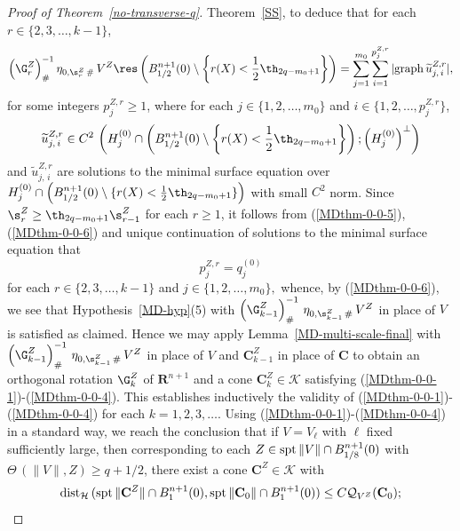 \documentclass[a4paper,11pt]{amsart}
\begin{document}
\begin{proof}[Proof of Theorem~\ref{no-transverse-q}]
Theorem~\ref{SS}, to deduce that for each $r \in \{2, 3, \ldots,k-1\}$, 
\begin{equation}\label{MDthm-0-0-6}
\left(\G_{r}^{Z}\right)^{-1}_{\#}\eta_{0, \s_{r}^{Z} \, \#} \, V^{Z} \res \left(B_{1/2}^{n+1}(0) \setminus \left\{r(X) < \frac{1}{2}\th_{2q-m_{0}+1}\right\}\right) = \sum_{j=1}^{m_{0}} \sum_{i=1}^{p_{j}^{Z,r}} |{\rm graph} \, \widetilde{u}_{j, \, i}^{Z,r}|,
\end{equation}
for some integers $p_{j}^{Z,r} \geq 1$, where for each $j \in \{1, 2, \ldots, m_{0}\}$ and $i \in \{1, 2, \ldots, p_{j}^{Z,r}\}$, 
$$\widetilde{u}_{j, \, i}^{Z,r}  \in C^{2}\,\left(H_{j}^{(0)} \cap \left(B_{1/2}^{n+1}(0) \setminus \left\{r(X) < \frac{1}{2}\th_{2q-m_{0}+1}\right\}\right); \left(H_{j}^{(0)}\right)^{\perp}\right)$$ 
and $\widetilde{u}_{j, \, i}^{Z,r}$ are solutions to the minimal surface equation over $H_{j}^{(0)} \cap \left(B_{1/2}^{n+1}(0) \setminus \{r(X) < \frac{1}{2}\th_{2q-m_{0}+1}\}\right)$ with small $C^{2}$ norm.
Since $\s_{r}^{Z} \geq \th_{2q-m_{0}+1} \s_{r-1}^{Z}$ for each $r \geq 1$, it follows from (\ref{MDthm-0-0-5}), (\ref{MDthm-0-0-6}) and unique continuation of solutions to the minimal surface equation that 
\begin{equation}\label{MDthm-9-0}
p_{j}^{Z,r} = q_{j}^{(0)}
\end{equation}
for each $r \in \{2, 3, \ldots, k-1\}$ and $j  \in \{1, 2,\ldots, m_{0}\},$ whence, by (\ref{MDthm-0-0-6}), we see that 
Hypothesis~\ref{MD-hyp}(5) with $\left(\G_{k-1}^{Z}\right)^{-1}_{\#} \, \eta_{0, \s_{k-1}^{Z} \, \#} \, V^{Z}$ in place of $V$ is satisfied as  claimed. Hence we may apply Lemma~\ref{MD-multi-scale-final} with 
$\left(\G_{k-1}^{Z}\right)^{-1}_{\#} \, \eta_{0, \s_{k-1}^{Z} \, \#} \, V^{Z}$ in place of $V$ and ${\mathbf C}_{k-1}^{Z}$ in place of ${\mathbf C}$ to obtain an orthogonal rotation $\G_{k}^{Z}$ of ${\mathbf R}^{n+1}$ and a cone ${\mathbf C}_{k}^{Z} \in {\mathcal K}$ satisfying (\ref{MDthm-0-0-1})-(\ref{MDthm-0-0-4}). This establishes inductively the validity of (\ref{MDthm-0-0-1})-(\ref{MDthm-0-0-4}) for each $k=1, 2, 3, \ldots$. Using (\ref{MDthm-0-0-1})-(\ref{MDthm-0-0-4}) in a standard way, we reach the conclusion that if $V = V_{\ell}$ with $\ell$ fixed sufficiently large, then corresponding to each $Z \in {\rm spt} \, \|V\| \cap B_{1/8}^{n+1}(0)$ with $\Theta \, (\|V\|, Z) \geq q+1/2$, there exist a cone ${\mathbf C}^{Z} \in {\mathcal K}$ with 
\begin{equation}\label{MDthm-4}
{\rm dist}_{\mathcal H} \, ({\rm spt} \, \|{\mathbf C}^{Z}\| \cap B_{1}^{n+1}(0), {\rm spt} \, \|{\mathbf C}_{0}\| \cap B_{1}^{n+1}(0)) \leq C{\mathcal Q}_{V^{Z}}({\mathbf C}_{0});

\end{equation}
\end{proof}
\end{document}
